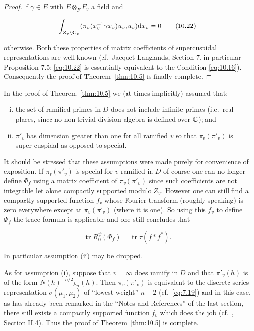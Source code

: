 \begin{proof}
if $\gamma \in E$ with $E \otimes_F F_v$ a field and

\begin{equation}\label{eq:10.22}
\int_{Z_v \backslash \mathbf{G}_v} (\pi_v(x_v^{-1}\gamma x_v)u_v, u_v) \mathrm{d} x_v = 0\tag{10.22}
\end{equation}

otherwise. Both these properties of matrix coefficients of supercuspidal representations are well known (cf.\ Jacquet-Langlands, Section 7, in particular Proposition 7.5; \eqref{eq:10.22} is essentially equivalent to the Condition \eqref{eq:10.16}). Consequently the proof of Theorem~\ref{thm:10.5} is finally complete.

\end{proof}

\begin{remark}\label{rem:10.7}

In the proof of Theorem~\ref{thm:10.5} we (at times implicitly) assumed that:

\begin{enumerate}[(i)]

\item the set of ramified primes in $D$ does not include infinite primes (i.e.\ real places, since no non-trivial division algebra is defined over $\mathbb{C}$); and

\item $\pi'_v$ has dimension greater than one for all ramified $v$ so that $\pi_v(\pi'_v)$ is super cuspidal as opposed to special.

\end{enumerate}

It should be stressed that these assumptions were made purely for convenience of exposition. If $\pi_v(\pi'_v)$ is special for $v$ ramified in $D$ of course one can no longer define $\Phi_f$ using a matrix coefficient of $\pi_v(\pi'_v)$ since such coefficients are not integrable let alone compactly supported modulo $Z_v$. However one can still find a compactly supported function $f_v$ whose Fourier transform (roughly speaking) is zero everywhere except at $\pi_v(\pi'_v)$ (where it is one). So using this $f_v$ to define $\Phi_f$ the trace formula is applicable and one still concludes that

\[
\operatorname{tr} R^{\psi}_0(\Phi_f) = \operatorname{tr} \tau(f * f^*).
\]

In particular assumption (ii) may be dropped.

As for assumption (i), suppose that $v = \infty$ does ramify in $D$ and that $\pi'_v(h)$ is of the form $N(h)^{-n/2}\rho_n(h)$. Then $\pi_v(\pi'_v)$ is equivalent to the discrete series representation $\sigma(\mu_1, \mu_2)$ of ``lowest weight'' $n + 2$ (cf.\ \eqref{eq:7.19}) and in this case, as has already been remarked in the ``Notes and References'' of the last section, there still exists a compactly supported function $f_v$ which does the job (cf.\ \cite{DufloLabesse}, Section II.4). Thus the proof of Theorem~\ref{thm:10.5} is complete.

\end{remark}

